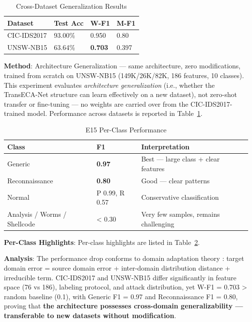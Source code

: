 \documentclass[sigconf]{acmart}
\begin{document}
\begin{table}[!t]
\caption{Cross-Dataset Generalization Results}
\label{tab:cross_gen}
\begin{tabular}{p{4.0cm}p{3.5cm}p{3.5cm}p{3.4cm}}
\toprule
\textbf{Dataset} & \textbf{Test Acc} & \textbf{W-F1} & \textbf{M-F1} \\
\midrule
CIC-IDS2017 & 93.00\% & 0.950 & 0.80 \\
UNSW-NB15 & 63.64\% & \textbf{0.703} & 0.397 \\
\bottomrule
\end{tabular}
\end{table}

\textbf{Method}: Architecture Generalization --- same architecture, zero modifications, trained from scratch on UNSW-NB15 \cite{8} (149K/26K/82K, 186 features, 10 classes). This experiment evaluates \emph{architecture generalization} (i.e., whether the TransECA-Net structure can learn effectively on a new dataset), not zero-shot transfer or fine-tuning --- no weights are carried over from the CIC-IDS2017-trained model. Performance across datasets is reported in Table~\ref{tab:cross_gen}.


\begin{table}[!t]
\caption{E15 Per-Class Performance}
\label{tab:e15_per_class}
\begin{tabular}{p{5.0cm}p{3.0cm}p{8.4cm}}
\toprule
\textbf{Class} & \textbf{F1} & \textbf{Interpretation} \\
\midrule
Generic & \textbf{0.97} & Best --- large class + clear features \\
Reconnaissance & \textbf{0.80} & Good --- clear patterns \\
Normal & P 0.99, R 0.57 & Conservative classification \\
Analysis / Worms / Shellcode & < 0.30 & Very few samples, remains challenging \\
\bottomrule
\end{tabular}
\end{table}

\textbf{Per-Class Highlights}: Per-class highlights are listed in Table~\ref{tab:e15_per_class}.

\textbf{Analysis}: The performance drop conforms to domain adaptation theory \cite{10}: target domain error = source domain error + inter-domain distribution distance + irreducible term. CIC-IDS2017 and UNSW-NB15 differ significantly in feature space (76 vs 186), labeling protocol, and attack distribution, yet W-F1 = 0.703 > random baseline (0.1), with Generic F1 = 0.97 and Reconnaissance F1 = 0.80, proving that \textbf{the architecture possesses cross-domain generalizability --- transferable to new datasets without modification}.
\end{document}
